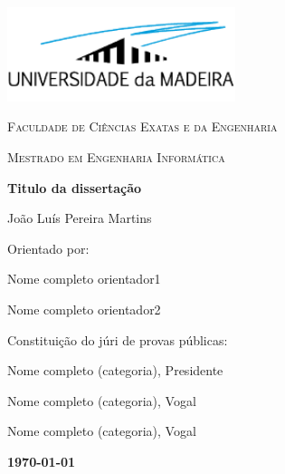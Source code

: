 \begin{titlepage}
    \centering
    \addtolength{\hoffset}{0.5cm}
        \centering
        \includegraphics[width=0.50\textwidth]{assets/images/uma_logo.png}\par\vspace{0.5cm}
        {\scshape\LARGE {} Faculdade de Ciências Exatas e da Engenharia \par}
        \vspace{1cm}
        {\scshape\Large Mestrado em Engenharia Informática \par}
        \vspace{1.5cm}
        {\huge\bfseries Titulo da dissertação \par}
        \vspace{2cm}
        {\Large João Luís Pereira Martins\par}
        \vfill
        {\large Orientado por: \par}
            Nome completo orientador1 \par
            Nome completo orientador2 \par
        \vfill
        {\large Constituição do júri de provas públicas: \par}
            Nome completo (categoria), Presidente \par
            Nome completo (categoria), Vogal \par
            Nome completo (categoria), Vogal \par
        \vfill
        {\large \bfseries \today \par}
    \end{titlepage}
